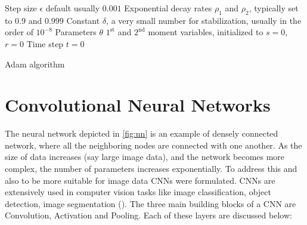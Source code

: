 \begin{algorithm}
	\SetAlgoLined
	Step size $\epsilon$ default usually $0.001$ \;
	Exponential decay rates $\rho_{1}$ and $\rho_{2}$, typically set to $0.9$ and $0.999$ \;
	Constant $\delta$, a very small number for stabilization, usually in the order of $10^{-8}$ \;
    Parameters $\theta$ \;
    $1^{\mathrm{st}}$ and $2^{\mathrm{nd}}$ moment variables, initialized to $s=0$, $r=0$ \;
    Time step $t=0$ \;
    
	\caption{Adam algorithm}
	\label{alg:adam}
\end{algorithm}

\section{Convolutional Neural Networks}

The neural network depicted in \ref{fig:nn} is an example of densely connected network, where all the neighboring nodes are connected with one another. As the size of data increases (say large image data), and the network becomes more complex, the number of parameters increases exponentially. To address this and also to be more suitable for image data \ac{CNN}s were formulated. \ac{CNN}s are extensively used in computer vision tasks like image classification, object detection, image segmentation (\cite{voulodimos2018deep}). The three main building blocks of a \ac{CNN} are Convolution, Activation and Pooling. Each of these layers are discussed below:

